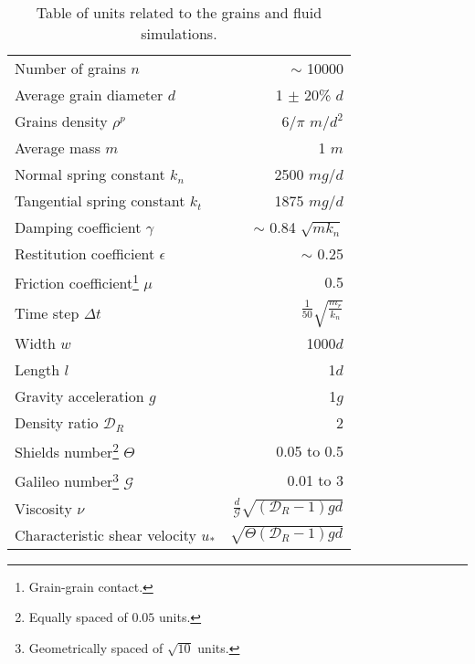 \begin{table}
    \centering
    \begin{tabular}{l r}
        \hline
        Number of grains $n$ & $\sim$ 10000 \\
        Average grain diameter $d$ & 1 $\pm$ 20\% $d$\\
        Grains density $\rho^p$ & 6/$\pi$ $m/d^2$\\
        Average mass $m$ & 1 $m$\\
        Normal spring constant $k_{n}$ & 2500 $m g/d$\\
        Tangential spring constant $k_{t}$ & 1875 $m g/d$ \\
        Damping coefficient $\gamma$ & $\sim$ 0.84 $\sqrt{m k_{n}}$ \\
        Restitution coefficient $\epsilon$ &  $\sim$ 0.25 \\
        Friction coefficient\footnote{Grain-grain contact.} $\mu$ & 0.5 \\
        Time step $\Delta t$ & $\frac{1}{50}\sqrt{\frac{m_r}{k_n}}$ \\
        Width $w$ & 1000$d$ \\
        Length $l$ & 1$d$\\
        Gravity acceleration $g$ & 1$g$ \\
        Density ratio $\mathcal{D}_{R}$ & 2 \\
        Shields number\footnote{Equally spaced of $0.05$ units.} $\Theta$ & 0.05 to 0.5 \\
        Galileo number\footnote{Geometrically spaced of $\sqrt{10}$ units.} $\mathcal{G}$ & 0.01 to 3 \\
        Viscosity $\nu$ & $\frac{d}{\mathcal{G}} \sqrt{\left(\mathcal{D}_{R}-1\right)gd}$ \\
        Characteristic shear velocity $u_{*}$ & $\sqrt{\Theta\left(\mathcal{D}_{R}-1\right)gd}$ \\
        \hline \hline
    \end{tabular}
    \caption{Table of units related to the grains and fluid simulations.}
    \label{tab:fluid}
\end{table}
